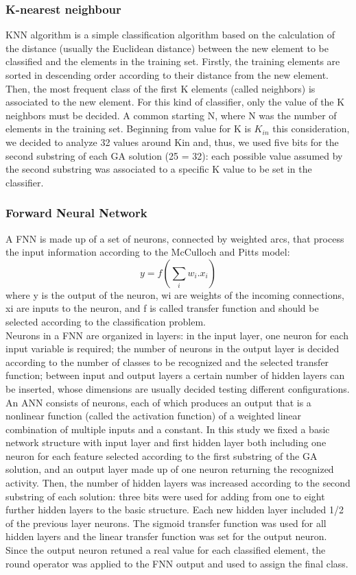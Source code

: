 \documentclass[journal,article,submit,moreauthors,pdftex]{Definitions/mdpi}
\begin{document}
\subsubsection{K-nearest neighbour}
KNN algorithm is a simple classification algorithm based on the calculation of the distance
(usually the Euclidean distance) between the new element to be classified and the elements in the training set. Firstly, the training elements are sorted in descending order according to their distance from the new element. Then, the most frequent class of the first K elements (called neighbors) is associated to the new element. For this kind of classifier, only the value of the K neighbors must be decided. A common starting N, where N was the number of elements in the training set. Beginning from
value for K is $ K_{in} $
this consideration, we decided to analyze 32 values around Kin and, thus, we used five bits for the second substring of each GA solution (25 = 32): each possible value assumed by the second substring was associated to a specific K value to be set in the classifier.
\subsubsection{Forward Neural Network}
A FNN is made up of a set of neurons, connected by weighted arcs, that process the input
information according to the McCulloch and Pitts model:
\begin{equation}\label{fnn_formula}
 y = f(\sum_{i}^{}w_{i}.x_{i})
\end{equation}
where y is the output of the neuron, wi are weights of the incoming connections, xi are inputs to the neuron, and f is called transfer function and should be selected according to the classification problem.\\
Neurons in a FNN are organized in layers: in the input layer, one neuron for each input variable is required; the number of neurons in the output layer is decided according to the number of classes to be recognized and the selected transfer function; between input and output layers a certain number of hidden layers can be inserted, whose dimensions are usually decided testing different configurations. \\
An ANN consists of neurons, each of which produces an output that is a nonlinear function (called the activation function) of a weighted linear combination of multiple inputs and a constant.
In this study we fixed a basic network structure with input layer and first hidden layer both including one neuron for each feature selected according to the first substring of the GA solution, and an output layer made up of one neuron returning the recognized activity. Then, the number of hidden layers was increased according to the second substring of each solution: three bits were used for adding from one to eight further hidden layers to the basic structure. Each new hidden layer included 1/2 of the previous layer neurons. The sigmoid transfer function was used for all hidden layers and the linear transfer function was set for the output neuron. Since the output neuron retuned a real value for each classified element, the round operator was applied to the FNN output and used to assign the final class.
\end{document}
